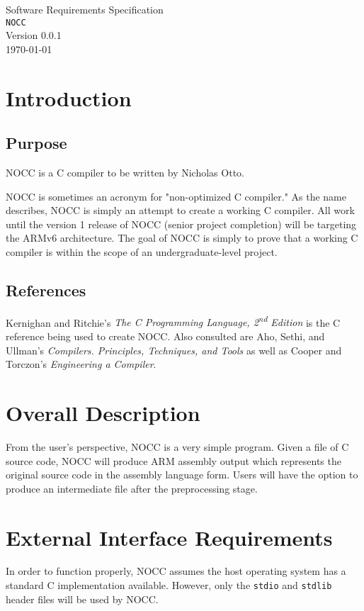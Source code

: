 \documentclass{article}
\newcommand{\NOCCVersion}{0.0.1}
\begin{document}
\begin{center}
\Huge
Software Requirements Specification\\\vspace{2cm}
\texttt{NOCC}\\\vspace{1cm}
\Large
Version \NOCCVersion\\
\today
\end{center}

\normalsize
\newpage
\section{Introduction}
\subsection{Purpose}
NOCC is a C compiler to be written by Nicholas Otto.

NOCC is sometimes an acronym for "non-optimized C compiler."  
As the name describes, NOCC is simply an attempt to create a working C compiler.  
All work until the version 1 release of NOCC (senior project completion) will be targeting the ARMv6 architecture.  
The goal of NOCC is simply to prove that a working C compiler is within the scope of an undergraduate-level project.

\subsection{References}
Kernighan and Ritchie's \textit{The C Programming Language, 2\textsuperscript{nd} Edition} is the C reference being used to create NOCC.
Also consulted are Aho, Sethi, and Ullman's \textit{Compilers.  Principles, Techniques, and Tools} as well as Cooper and Torczon's \textit{Engineering a Compiler}.

\section{Overall Description}
From the user's perspective, NOCC is a very simple program.  
Given a file of C source code, NOCC will produce ARM assembly output which represents the original source code in the assembly language form.
Users will have the option to produce an intermediate file after the preprocessing stage.

\section{External Interface Requirements}
In order to function properly, NOCC assumes the host operating system has a standard C implementation available.  
However, only the \texttt{stdio} and \texttt{stdlib} header files will be used by NOCC.
\end{document}
